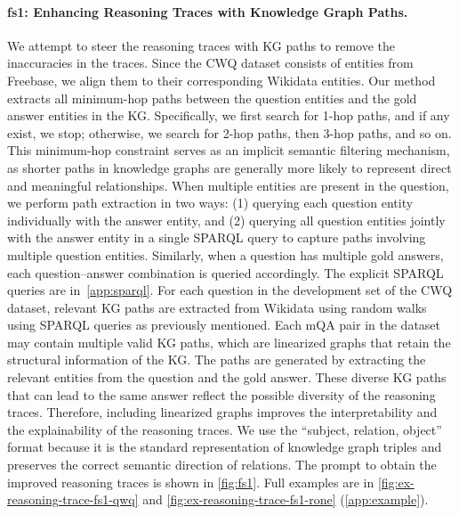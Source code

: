 \documentclass[11pt]{article}
\newcommand{\dataset}{\textbf{fs1}}
\begin{document}
\paragraph{\dataset{}: Enhancing Reasoning Traces with Knowledge Graph Paths.}
We attempt to steer the reasoning traces with KG paths to remove the inaccuracies in the traces. 
Since the CWQ dataset consists of entities from Freebase, we align them to their corresponding Wikidata entities. Our method extracts all minimum-hop paths between the question entities and the gold answer entities in the KG. Specifically, we first search for 1-hop paths, and if any exist, we stop; otherwise, we search for 2-hop paths, then 3-hop paths, and so on. This minimum-hop constraint serves as an implicit semantic filtering mechanism, as shorter paths in knowledge graphs are generally more likely to represent direct and meaningful relationships. When multiple entities are present in the question, we perform path extraction in two ways: (1) querying each question entity individually with the answer entity, and (2) querying all question entities jointly with the answer entity in a single SPARQL query to capture paths involving multiple question entities. Similarly, when a question has multiple gold answers, each question–answer combination is queried accordingly. The explicit SPARQL queries are in~\cref{app:sparql}. %
For each question in the development set of the CWQ dataset, relevant KG paths are extracted from Wikidata using random walks using SPARQL queries as previously mentioned. 
Each mQA pair in the dataset may contain multiple valid KG paths, which are linearized graphs that retain the structural information of the KG. The paths are generated by extracting the relevant entities from the question and the gold answer. These diverse KG paths that can lead to the same answer reflect the possible diversity of the reasoning traces. Therefore, including linearized graphs improves the interpretability and the explainability of the reasoning traces.
We use the ``subject, relation, object'' format because it is the standard representation of knowledge graph triples and preserves the correct semantic direction of relations.
The prompt to obtain the improved reasoning traces is shown in \cref{fig:fs1}.
Full examples are in \cref{fig:ex-reasoning-trace-fs1-qwq} and \cref{fig:ex-reasoning-trace-fs1-rone} (\cref{app:example}).
\end{document}
